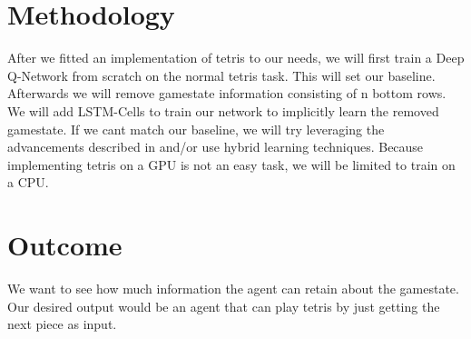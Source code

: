 \documentclass[10pt,twocolumn,letterpaper]{article}
\begin{document}
\section{Methodology}
    After we fitted an implementation of tetris to our needs, we will first train a Deep Q-Network from scratch on the normal tetris task. This will set our baseline. Afterwards we will remove gamestate information consisting of n bottom rows. We will add LSTM-Cells to train our network to implicitly learn the removed gamestate. If we cant match our baseline, we will try leveraging the advancements described in \cite{hessel2017rainbow} and/or use hybrid learning techniques\cite{henderson2005hybrid}. Because implementing tetris on a GPU is not an easy task, we will be limited to train on a CPU.

\section{Outcome}
   We want to see how much information the agent can retain about the gamestate. Our desired output would be an agent that can play tetris by just getting the next piece as input.

{\small


}
\end{document}
